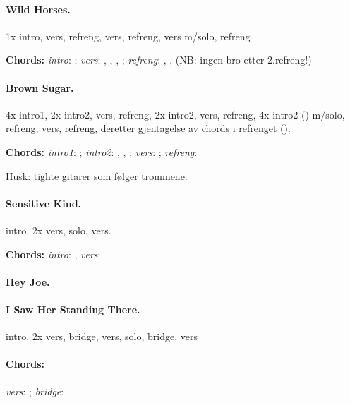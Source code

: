 \documentclass[%
twoside,                 %
final,                   %
10pt]{article}
\begin{document}
\paragraph{Wild Horses.}
1x intro, vers, refreng, vers, refreng, vers m/solo, refreng

\textbf{Chords:} \emph{intro}: ;
\emph{vers}: , , , ;
\emph{refreng}: , , 
(NB: ingen bro etter 2.refreng!)





\paragraph{Brown Sugar.}
4x intro1, 2x intro2, vers, refreng, 2x intro2, vers, refreng, 4x intro2 () m/solo, refreng, vers, refreng, deretter gjentagelse av chords i refrenget ().

\textbf{Chords:} \emph{intro1}: ; \emph{intro2}: , , ;
\emph{vers}: ; \emph{refreng}: 

Husk: tighte gitarer som følger trommene.




\paragraph{Sensitive Kind.}
intro, 2x vers, solo, vers.

\textbf{Chords:} \emph{intro}: , \emph{vers}: 





\paragraph{Hey Joe.}
\paragraph{I Saw Her Standing There.}
intro, 2x vers, bridge, vers, solo, bridge, vers

\paragraph{Chords:}
\emph{vers}: ; \emph{bridge}: 
\end{document}
